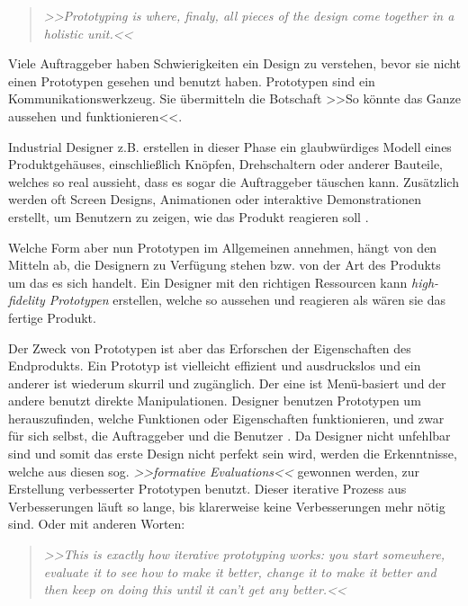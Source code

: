 \begin{quote}
	\textsl{>>Prototyping is where, finaly, all pieces of the design come together in a holistic unit.<<}
\begin{flushright}\citep{Saffer:2007}\end{flushright}
\end{quote}

Viele Auftraggeber haben Schwierigkeiten ein Design zu verstehen, bevor sie nicht einen Prototypen gesehen und benutzt haben. Prototypen sind ein Kommunikationswerkzeug. Sie übermitteln die Botschaft >>So könnte das Ganze aussehen und funktionieren<<.

\medskip Industrial Designer z.B. erstellen in dieser Phase ein glaubwürdiges Modell eines Produktgehäuses, einschließlich Knöpfen, Drehschaltern oder anderer Bauteile, welches so real aussieht, dass es sogar die Auftraggeber täuschen kann. Zusätzlich werden oft Screen Designs, Animationen oder interaktive Demonstrationen erstellt, um Benutzern zu zeigen, wie das Produkt reagieren soll \citep{Vertelney:1990}.

\medskip Welche Form aber nun Prototypen im Allgemeinen annehmen, hängt von den Mitteln ab, die Designern zu Verfügung stehen bzw. von der Art des Produkts um das es sich handelt. Ein Designer mit den richtigen Ressourcen kann \emph{high-fidelity Prototypen} erstellen, welche so aussehen und reagieren als wären sie das fertige Produkt.

Der Zweck von Prototypen ist aber das Erforschen der Eigenschaften des Endprodukts. Ein Prototyp ist vielleicht effizient und ausdruckslos und ein anderer ist wiederum skurril und zugänglich. Der eine ist Menü-basiert und der andere benutzt direkte Manipulationen. Designer benutzen Prototypen um herauszufinden, welche Funktionen oder Eigenschaften funktionieren, und zwar für sich selbst, die Auftraggeber und die Benutzer \citep{Saffer:2007}. Da Designer nicht unfehlbar sind und somit das erste Design nicht perfekt sein wird, werden die Erkenntnisse, welche aus diesen sog. \emph{>>formative Evaluations<<} gewonnen werden, zur Erstellung verbesserter Prototypen benutzt. Dieser iterative Prozess aus Verbesserungen läuft so lange, bis klarerweise keine Verbesserungen mehr nötig sind. Oder mit anderen Worten: 

\begin{quote}
	\textsl{>>This is exactly how iterative prototyping works: you start somewhere, evaluate it to see how to make it better, change it to make it better and then keep on doing this until it can't get any better.<<}
\begin{flushright}\citep{Dix:2004}\end{flushright}
\end{quote}


